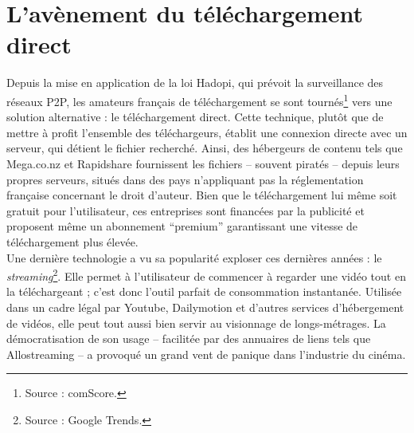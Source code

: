 \documentclass[a4paper]{report}
\begin{document}
	\section{L'avènement du téléchargement direct}
	Depuis la mise en application de la loi Hadopi, qui prévoit la surveillance des réseaux P2P, les amateurs français de téléchargement se sont tournés\footnote{Source : comScore.} vers une solution alternative : le téléchargement direct. Cette technique, plutôt que de mettre à profit l'ensemble des téléchargeurs, établit une connexion directe avec un serveur, qui détient le fichier recherché. Ainsi, des hébergeurs de contenu tels que Mega.co.nz et Rapidshare fournissent les fichiers – souvent piratés – depuis leurs propres serveurs, situés dans des pays n'appliquant pas la réglementation française concernant le droit d'auteur. Bien que le téléchargement lui même soit gratuit pour l'utilisateur, ces entreprises sont financées par la publicité et proposent même un abonnement ``premium'' garantissant une vitesse de téléchargement plus élevée.\\

	Une dernière technologie a vu sa popularité exploser ces dernières années : le \emph{streaming}\footnote{Source : Google Trends.}. Elle permet à l'utilisateur de commencer à regarder une vidéo tout en la téléchargeant ; c'est donc l'outil parfait de consommation instantanée. Utilisée dans un cadre légal par Youtube, Dailymotion et d'autres services d'hébergement de vidéos, elle peut tout aussi bien servir au visionnage de longs-métrages. La démocratisation de son usage – facilitée par des annuaires de liens tels que Allostreaming – a provoqué un grand vent de panique dans l'industrie du cinéma.

\end{document}
